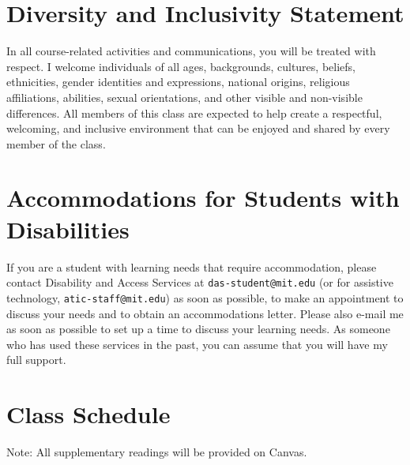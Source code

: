 \documentclass[letterpaper]{infinity_syllabus} %
\begin{document}
\vspace{0.5cm}
\section{Diversity and Inclusivity Statement}

In all course-related activities and communications, you will be treated with respect.
I welcome individuals of all ages, backgrounds, cultures, beliefs, ethnicities, gender identities and expressions, national origins, religious affiliations, abilities, sexual orientations, and other visible and non-visible differences.
All members of this class are expected to help create a respectful, welcoming, and inclusive environment that can be enjoyed and shared by every member of the class.

\vspace{0.5cm}
\section{Accommodations for Students with Disabilities}

If you are a student with learning needs that require accommodation, please contact Disability and Access Services at \texttt{das-student@mit.edu} (or for assistive technology, \texttt{atic-staff@mit.edu}) as soon as possible, to make an appointment to discuss your needs and to obtain an accommodations letter.
Please also e-mail me as soon as possible to set up a time to discuss your learning needs.
As someone who has used these services in the past, you can assume that you will have my full support.


\newpage
\makeFullPage
\section{Class Schedule}

Note: All supplementary readings will be provided on Canvas.\\
\end{document}
